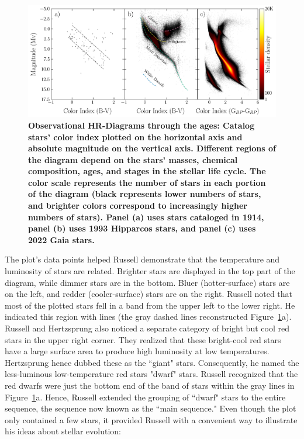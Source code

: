 \begin{figure}
\begin{center}
  \centerline{\includegraphics[width=1.2\linewidth]{figures/hr_diagram.png}}
  \caption{\textbf{Observational HR-Diagrams through the ages: Catalog stars' color index plotted on the horizontal axis and absolute magnitude on the vertical axis. Different regions of the diagram depend on the stars' masses, chemical composition, ages, and stages in the stellar life cycle. The color scale represents the number of stars in each portion of the diagram (black represents lower numbers of stars, and brighter colors correspond to increasingly higher numbers of stars). Panel (a) uses stars cataloged in 1914, panel (b) uses 1993 Hipparcos stars, and panel (c) uses 2022 Gaia stars. 
}  }
  \label{fig:HR-diagrams}
\end{center}
\end{figure}

The plot's data points helped Russell demonstrate that the temperature and luminosity of stars are related.
Brighter stars are displayed in the top part of the diagram, while dimmer stars are in the bottom. 
Bluer (hotter-surface) stars are on the left, and redder (cooler-surface) stars are on the right. 
Russell noted that most of the plotted stars fell in a band from the upper left to the lower right.
He indicated this region with lines (the gray dashed lines reconstructed Figure~\ref{fig:HR-diagrams}a).
Russell and Hertzsprung also noticed a separate category of bright but cool red stars in the upper right corner. 
They realized that these bright-cool red stars have a large surface area to produce high luminosity at low temperatures. 
Hertzsprung hence dubbed these as the ``giant" stars.  
Consequently, he named the less-luminous low-temperature red stars "dwarf" stars. 
Russell recognized that the red dwarfs were just the bottom end of the band of stars within the gray lines in Figure~\ref{fig:HR-diagrams}a. 
Hence, Russell extended the grouping of ``dwarf" stars to the entire sequence, the sequence now known as the ``main sequence."
Even though the plot only contained a few stars, it provided Russell with a convenient way to illustrate his ideas about stellar evolution:

